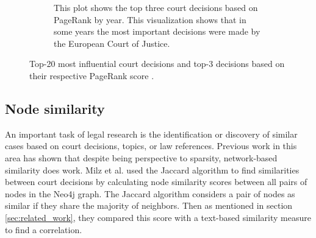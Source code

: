 \documentclass[runningheads]{llncs}
\begin{document}
\begin{figure}[!h]
\begin{subfigure}[b]{0.49\textwidth}
         \caption{This plot shows the top three court decisions based on PageRank by year. This visualization shows that in some years the most important decisions were made by the European Court of Justice.}
         \label{fig:pr_1o_year}
     \end{subfigure}
    \caption{Top-20 most influential court decisions and top-3 decisions based on their respective PageRank score \cite{milz2021analysis}.}
\end{figure}

\subsection{Node similarity}

An important task of legal research is the identification or discovery of similar cases based on court decisions, topics, or law references. Previous work in this area has shown that despite being perspective to sparsity, network-based similarity does work. Milz et al. \cite{milz2021analysis} used the Jaccard algorithm to find similarities between court decisions by calculating node similarity scores between all pairs of nodes in the Neo4j graph. The Jaccard algorithm considers a pair of nodes as similar if they share the majority of neighbors. Then as mentioned in section \ref{sec:related_work}, they compared this score with a text-based similarity measure to find a correlation.
\end{document}
